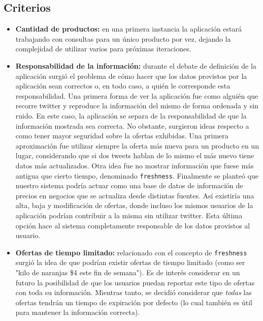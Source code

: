 \documentclass[10pt, a4paper]{article}
\begin{document}
  \subsection{Criterios}
  \begin{itemize}
    \item\textbf{Cantidad de productos:} en una primera instancia la aplicación estará trabajando con consultas para un único producto por vez, 
      dejando la complejidad de utilizar varios para próximas iteraciones.
    \item\textbf{Responsabilidad de la información:} durante el debate de definición de la aplicación surgió el problema de cómo hacer que los datos
      provistos por la aplicación sean correctos o, en todo caso, a quién le corresponde esta responsabilidad. Una primera forma de ver la aplicación
      fue como alguién que recorre twitter y reproduce la información del mismo de forma ordenada y sin ruido. En este caso, la aplicación se separa
      de la responsabilidad de que la información mostrada sea correcta. No obstante, surgieron ideas respecto a como tener mayor seguridad sobre la 
      ofertas exhibidas. Una primera aproximación fue utilizar siempre la oferta más nueva para un producto en un lugar, considerando que si dos tweets
      hablan de lo mismo el más nuevo tiene datos más actualizados. Otra idea fue no mostrar información que fuese más antigua que cierto tiempo, 
      denominado \texttt{freshness}. Finalmente se planteó que nuestro sistema podría actuar como una base de datos de información de precios en negocios
      que se actualiza desde distintas fuentes. Así existiría una alta, baja y modificación de ofertas, donde incluso los mismos usuarios de la aplicación
      podrían contribuir a la misma sin utilizar twitter. Esta última opción hace al sistema completamente responsable de los datos provistos al usuario.
    \item\textbf{Ofertas de tiempo limitado:} relacionado con el concepto de \texttt{freshness} surgió la idea de que podrían existir ofertas de tiempo 
      limitado (como ser "kilo de naranjas \$4 este fin de semana"). Es de interés considerar en un futuro la posibilidad de que los usuarios puedan
      reportar este tipo de ofertas con toda su información. Mientras tanto, se decidió considerar que \emph{todas} las \textsf{ofertas} tendrán un
      tiempo de expiración por defecto (lo cual también es útil para mantener la información correcta).
  \end{itemize}
\end{document}
